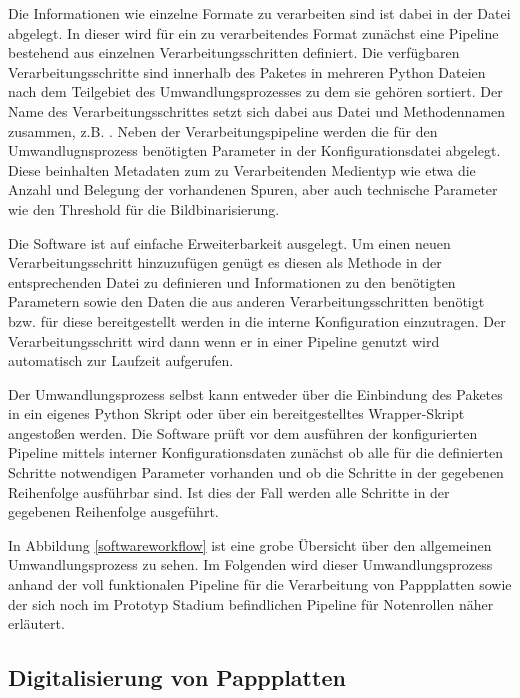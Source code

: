 Die Informationen wie einzelne Formate zu verarbeiten sind ist dabei in der  Datei abgelegt.
In dieser wird für ein zu verarbeitendes Format zunächst eine Pipeline bestehend aus einzelnen Verarbeitungsschritten definiert.
Die verfügbaren Verarbeitungsschritte sind innerhalb des Paketes in mehreren Python Dateien nach dem Teilgebiet des Umwandlungsprozesses zu dem sie gehören sortiert.
Der Name des Verarbeitungsschrittes setzt sich dabei aus Datei und Methodennamen zusammen, z.B. .
Neben der Verarbeitungspipeline werden die für den Umwandlugnsprozess benötigten Parameter in der Konfigurationsdatei abgelegt.
Diese beinhalten Metadaten zum zu Verarbeitenden Medientyp wie etwa die Anzahl und Belegung der vorhandenen Spuren, aber auch technische Parameter wie den Threshold für die Bildbinarisierung.

Die Software ist auf einfache Erweiterbarkeit ausgelegt.
Um einen neuen Verarbeitungsschritt hinzuzufügen genügt es diesen als Methode in der entsprechenden Datei zu definieren und Informationen zu den benötigten Parametern sowie den Daten die aus anderen Verarbeitungsschritten benötigt bzw. für diese bereitgestellt werden in die interne Konfiguration einzutragen.
Der Verarbeitungsschritt wird dann wenn er in einer Pipeline genutzt wird automatisch zur Laufzeit aufgerufen.

Der Umwandlungsprozess selbst kann entweder über die Einbindung des Paketes in ein eigenes Python Skript oder über ein bereitgestelltes Wrapper-Skript angestoßen werden.
Die Software prüft vor dem ausführen der konfigurierten Pipeline mittels interner Konfigurationsdaten zunächst ob alle für die definierten Schritte notwendigen Parameter vorhanden und ob die Schritte in der gegebenen Reihenfolge ausführbar sind.
Ist dies der Fall werden alle Schritte in der gegebenen Reihenfolge ausgeführt.

In Abbildung \ref*{softwareworkflow} ist eine grobe Übersicht über den allgemeinen Umwandlungsprozess zu sehen.
Im Folgenden wird dieser Umwandlungsprozess anhand der voll funktionalen Pipeline für die Verarbeitung von Pappplatten sowie der sich noch im Prototyp Stadium befindlichen Pipeline für Notenrollen näher erläutert.

\subsection{Digitalisierung von Pappplatten}

